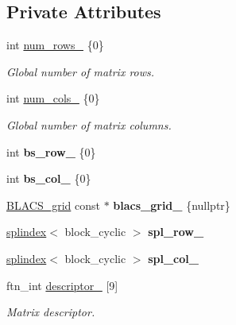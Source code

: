 \subsection*{Private Attributes}
\begin{DoxyCompactItemize}
\item 
int \hyperlink{classsddk_1_1dmatrix_ada5ad5c79203f9db5863ff8a94785968}{num\+\_\+rows\+\_\+} \{0\}
\begin{DoxyCompactList}\small\item\em Global number of matrix rows. \end{DoxyCompactList}\item 
int \hyperlink{classsddk_1_1dmatrix_a6b7c813717810ff63c246504c67e1ab5}{num\+\_\+cols\+\_\+} \{0\}
\begin{DoxyCompactList}\small\item\em Global number of matrix columns. \end{DoxyCompactList}\item 
\hypertarget{classsddk_1_1dmatrix_ad20a8c65fc2588b20506e00f98fba4d7}{}int {\bfseries bs\+\_\+row\+\_\+} \{0\}\label{classsddk_1_1dmatrix_ad20a8c65fc2588b20506e00f98fba4d7}

\item 
\hypertarget{classsddk_1_1dmatrix_aa46167a494f383ca8511e3b5ae4643c9}{}int {\bfseries bs\+\_\+col\+\_\+} \{0\}\label{classsddk_1_1dmatrix_aa46167a494f383ca8511e3b5ae4643c9}

\item 
\hypertarget{classsddk_1_1dmatrix_a90356b2f4ae42e31c9d081c53f1f37e1}{}\hyperlink{classsddk_1_1_b_l_a_c_s__grid}{B\+L\+A\+C\+S\+\_\+grid} const $\ast$ {\bfseries blacs\+\_\+grid\+\_\+} \{nullptr\}\label{classsddk_1_1dmatrix_a90356b2f4ae42e31c9d081c53f1f37e1}

\item 
\hypertarget{classsddk_1_1dmatrix_a15c80ec492bbe71a5805332ef899a46a}{}\hyperlink{classsddk_1_1splindex}{splindex}$<$ block\+\_\+cyclic $>$ {\bfseries spl\+\_\+row\+\_\+}\label{classsddk_1_1dmatrix_a15c80ec492bbe71a5805332ef899a46a}

\item 
\hypertarget{classsddk_1_1dmatrix_a904fce2ba509ae0013500705341ec4b9}{}\hyperlink{classsddk_1_1splindex}{splindex}$<$ block\+\_\+cyclic $>$ {\bfseries spl\+\_\+col\+\_\+}\label{classsddk_1_1dmatrix_a904fce2ba509ae0013500705341ec4b9}

\item 
ftn\+\_\+int \hyperlink{classsddk_1_1dmatrix_a8461e9f58455228fcda1403a3a945b85}{descriptor\+\_\+} \mbox{[}9\mbox{]}
\begin{DoxyCompactList}\small\item\em Matrix descriptor. \end{DoxyCompactList}\end{DoxyCompactItemize}
